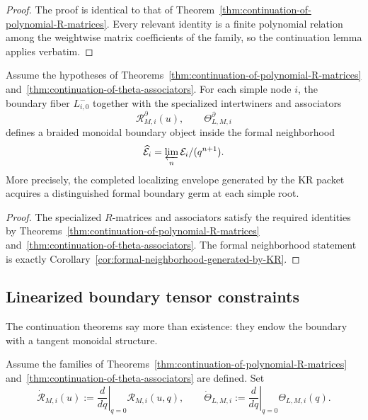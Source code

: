 \begin{proof}
The proof is identical to that of
Theorem~\ref{thm:continuation-of-polynomial-R-matrices}. Every relevant
identity is a finite polynomial relation among the weightwise matrix
coefficients of the family, so the continuation lemma applies verbatim.
\end{proof}

\begin{corollary}
\ClaimStatusProvedHere
\label{cor:formal-braided-boundary-germ}
Assume the hypotheses of
Theorems~\ref{thm:continuation-of-polynomial-R-matrices}
and~\ref{thm:continuation-of-theta-associators}. For each simple node
$i$, the boundary fiber $L^-_{i,0}$ together with the
specialized intertwiners and associators
\begin{equation}
\mathscr R_{M,i}^{\partial}(u),
\qquad
\Theta^{\partial}_{L,M,i}
\end{equation}
defines a braided monoidal boundary object inside the formal neighborhood
\begin{equation}
\widehat{\mathcal E}_i=\varprojlim_n \mathcal E_i/(q^{n+1}).
\end{equation}
More precisely, the completed localizing envelope generated by the KR
packet acquires a distinguished formal boundary germ at each simple root.
\end{corollary}

\begin{proof}
The specialized $R$-matrices and associators satisfy the required
identities by
Theorems~\ref{thm:continuation-of-polynomial-R-matrices}
and~\ref{thm:continuation-of-theta-associators}. The formal neighborhood
statement is exactly Corollary~\ref{cor:formal-neighborhood-generated-by-KR}.
\end{proof}

\subsection{Linearized boundary tensor constraints}

The continuation theorems say more than existence: they endow the boundary
with a tangent monoidal structure.

\begin{definition}
\label{def:boundary-tangent-tensors}
Assume the families of
Theorems~\ref{thm:continuation-of-polynomial-R-matrices}
and~\ref{thm:continuation-of-theta-associators} are defined. Set
\begin{equation}
\dot{\mathscr R}_{M,i}(u)
:=
\left.\frac{d}{dq}\right|_{q=0}\mathscr R_{M,i}(u,q),
\qquad
\dot\Theta_{L,M,i}
:=
\left.\frac{d}{dq}\right|_{q=0}\Theta_{L,M,i}(q).
\end{equation}
\end{definition}

